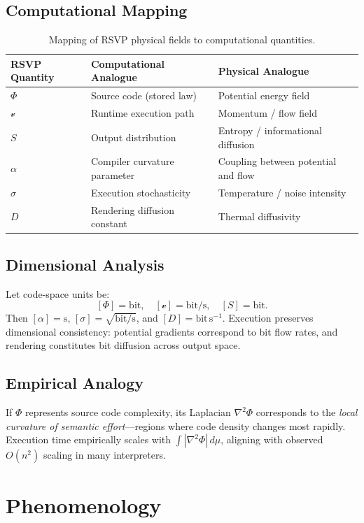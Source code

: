 \documentclass[12pt,a4paper]{article}
\theoremstyle{plain}
\theoremstyle{definition}
\theoremstyle{remark}
\newcommand{\Phifield}{\Phi}
\newcommand{\vfield}{\mathcal{v}}
\newcommand{\Sfield}{S}
\begin{document}
\subsection{Computational Mapping}
\begin{table}[H]
\centering
\renewcommand{\arraystretch}{1.15}
\begin{tabular}{lll}
\toprule
\textbf{RSVP Quantity} & \textbf{Computational Analogue} & \textbf{Physical Analogue} \\
\midrule
$\Phifield$ & Source code (stored law) & Potential energy field \\
$\vfield$ & Runtime execution path & Momentum / flow field \\
$\Sfield$ & Output distribution & Entropy / informational diffusion \\
$\alpha$ & Compiler curvature parameter & Coupling between potential and flow \\
$\sigma$ & Execution stochasticity & Temperature / noise intensity \\
$D$ & Rendering diffusion constant & Thermal diffusivity \\
\bottomrule
\end{tabular}
\caption{Mapping of RSVP physical fields to computational quantities.}
\label{tab:rsvp-mapping}
\end{table}

\subsection{Dimensional Analysis}
Let code-space units be:
\[
[\Phifield] = \text{bit}, \quad [\vfield] = \text{bit}/\text{s}, \quad [\Sfield] = \text{bit}.
\]
Then $[\alpha] = \text{s}$, $[\sigma] = \sqrt{\text{bit}/\text{s}}$, and $[D]=\text{bit}\,\text{s}^{-1}$. Execution preserves dimensional consistency: potential gradients correspond to bit flow rates, and rendering constitutes bit diffusion across output space.

\subsection{Empirical Analogy}
If $\Phifield$ represents source code complexity, its Laplacian $\nabla^2\Phifield$ corresponds to the \emph{local curvature of semantic effort}—regions where code density changes most rapidly. Execution time empirically scales with $\int |\nabla^2\Phifield|\,d\mu$, aligning with observed $O(n^2)$ scaling in many interpreters.

\section{Phenomenology}
\label{app:phenomenology}
\end{document}
